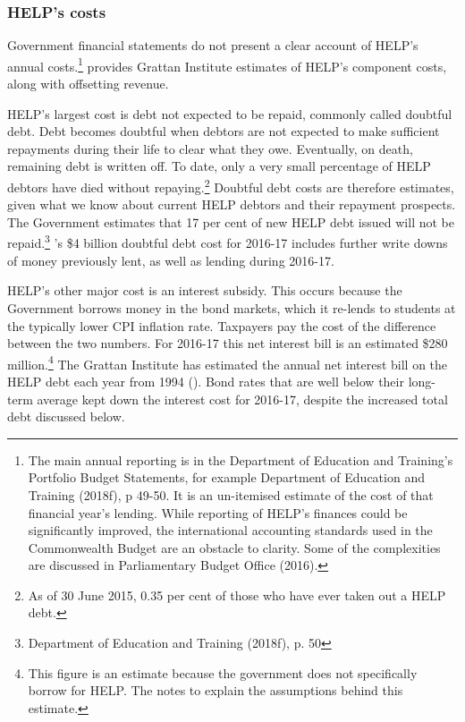 \documentclass{grattan}
\begin{document}
%
\subsubsection{HELP's costs}\label{subsubsec:helps-costs}

Government financial statements do not present a clear account of HELP's annual costs.\footnote{The main annual reporting is in the Department of Education and Training's Portfolio Budget Statements, for example Department of Education and Training (2018f), p 49-50. It is an un-itemised estimate of the cost of that financial year's lending. While reporting of HELP's finances could be significantly improved, the international accounting standards used in the Commonwealth Budget are an obstacle to clarity. Some of the complexities are discussed in Parliamentary Budget Office (2016).}  provides Grattan Institute estimates of HELP's component costs, along with offsetting revenue.

HELP's largest cost is debt not expected to be repaid, commonly called doubtful debt. Debt becomes doubtful when debtors are not expected to make sufficient repayments during their life to clear what they owe. Eventually, on death, remaining debt is written off. To date, only a very small percentage of HELP debtors have died without repaying.\footnote{As of 30 June 2015, 0.35 per cent of those who have ever taken out a HELP debt.} Doubtful debt costs are therefore estimates, given what we know about current HELP debtors and their repayment prospects. The Government estimates that 17 per cent of new HELP debt issued will not be repaid.\footnote{Department of Education and Training (2018f), p. 50} 's \$4 billion doubtful debt cost for 2016-17 includes further write downs of money previously lent, as well as lending during 2016-17.

HELP's other major cost is an interest subsidy. This occurs because the Government borrows money in the bond markets, which it re-lends to students at the typically lower CPI inflation rate. Taxpayers pay the cost of the difference between the two numbers. For 2016-17 this net interest bill is an estimated \$280 million.\footnote{This figure is an estimate because the government does not specifically borrow for HELP. The notes to  explain the assumptions behind this estimate.} The Grattan Institute has estimated the annual net interest bill on the HELP debt each year from 1994 (). Bond rates that are well below their long-term average kept down the interest cost for 2016-17, despite the increased total debt discussed below.
\end{document}
